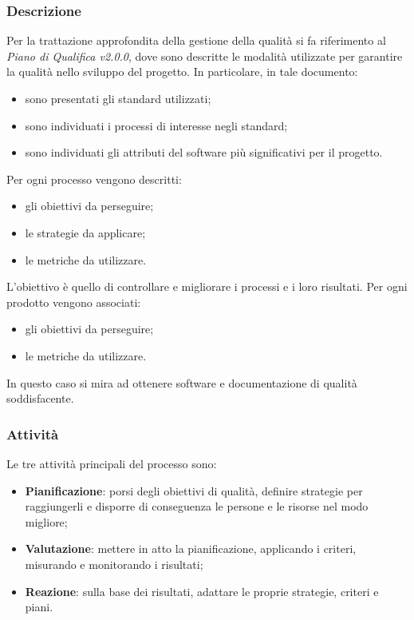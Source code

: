 	\subsubsection{Descrizione}
	Per la trattazione approfondita della gestione della qualità si fa riferimento al \textit{Piano di Qualifica v2.0.0}, dove sono descritte le modalità utilizzate per garantire la qualità nello sviluppo del progetto. In particolare, in tale documento:
	\begin{itemize}
		\item sono presentati gli standard utilizzati;
		\item sono individuati i processi di interesse negli standard;
		\item sono individuati gli attributi del software più significativi per il progetto.
	\end{itemize}
	Per ogni processo vengono descritti:
	\begin{itemize}
		\item gli obiettivi da perseguire;
		\item le strategie da applicare;
		\item le metriche da utilizzare.
	\end{itemize}
	L'obiettivo è quello di controllare e migliorare i processi e i loro risultati.
	Per ogni prodotto vengono associati:
	\begin{itemize}
		\item gli obiettivi da perseguire;
		\item le metriche da utilizzare.
	\end{itemize}
	In questo caso si mira ad ottenere software e documentazione di qualità soddisfacente.
	\subsubsection{Attività}
	Le tre attività principali del processo sono:
	\begin{itemize}
		\item \textbf{Pianificazione}: porsi degli obiettivi di qualità, definire strategie per raggiungerli e disporre di conseguenza le persone e le risorse nel modo migliore;
		\item \textbf{Valutazione}: mettere in atto la pianificazione, applicando i criteri, misurando e monitorando i risultati; 
		\item \textbf{Reazione}: sulla base dei risultati, adattare le proprie strategie, criteri e piani.
	\end{itemize}
